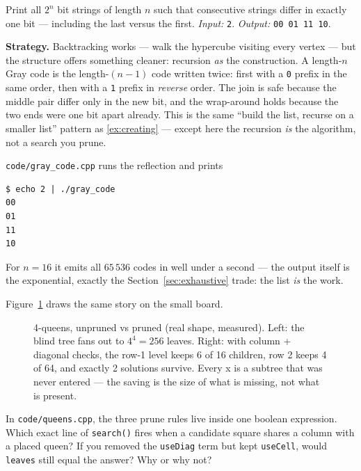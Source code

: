 \begin{example}
\label{ex:gray}
Print all $2^n$ bit strings of length $n$ such that consecutive strings
differ in exactly one bit --- including the last versus the first.
\emph{Input:} \texttt{2}. \emph{Output:} \texttt{00 01 11 10}.
\par\smallskip
\textbf{Strategy.} Backtracking works --- walk the hypercube visiting
every vertex --- but the structure offers something cleaner: recursion
\emph{as} the construction. A length-$n$ Gray code is the length-$(n{-}1)$
code written twice: first with a \texttt{0} prefix in the same order,
then with a \texttt{1} prefix in \emph{reverse} order. The join is safe
because the middle pair differ only in the new bit, and the wrap-around
holds because the two ends were one bit apart already. This is the same
``build the list, recurse on a smaller list'' pattern as
\ref{ex:creating} --- except here the recursion \emph{is} the algorithm,
not a search you prune.
\par\smallskip
\begin{solution}
\texttt{code/gray\_code.cpp} runs the reflection and prints
\begin{lstlisting}[numbers=none]
$ echo 2 | ./gray_code
00
01
11
10
\end{lstlisting}
For $n{=}16$ it emits all $65\,536$ codes in well under a second ---
the output itself is the exponential, exactly the
Section~\ref{sec:exhaustive} trade: the list \emph{is} the work.
\end{solution}
\end{example}

Figure~\ref{fig:queentree} draws the same story on the small board.

\begin{figure}[ht]\centering

\caption{4-queens, unpruned vs pruned (real shape, measured). Left: the blind
tree fans out to $4^4 = 256$ leaves. Right: with column + diagonal checks, the
row-1 level keeps 6 of 16 children, row 2 keeps 4 of 64, and exactly 2
solutions survive. Every \textsf{x} is a subtree that was never entered ---
the saving is the size of what is missing, not what is present.}
\label{fig:queentree}
\end{figure}

\begin{exercise}[medium]\label{exr:prunefire}
In \texttt{code/queens.cpp}, the three prune rules live inside one boolean
expression. Which exact line of \texttt{search()} fires when a candidate
square shares a column with a placed queen? If you removed the
\texttt{useDiag} term but kept \texttt{useCell}, would \texttt{leaves} still
equal the answer? Why or why not?
\end{exercise}

